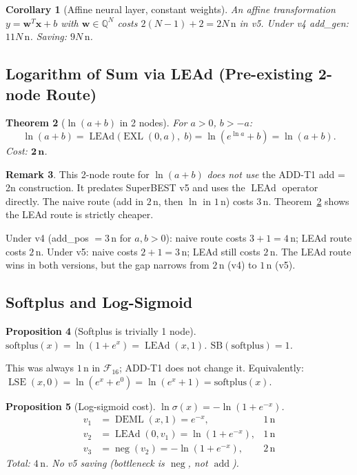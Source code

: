 \documentclass[12pt,a4paper]{article}
\newtheorem{theorem}{Theorem}[section]
\newtheorem{corollary}[theorem]{Corollary}
\newtheorem{proposition}[theorem]{Proposition}
\theoremstyle{definition}
\newtheorem{remark}[theorem]{Remark}
\newcommand{\EXL}{\operatorname{EXL}}
\newcommand{\DEML}{\operatorname{DEML}}
\newcommand{\LEAd}{\operatorname{LEAd}}
\newcommand{\addop}{\operatorname{add}}
\newcommand{\negop}{\operatorname{neg}}
\newcommand{\SB}{\mathrm{SB}}
\newcommand{\LSE}{\operatorname{LSE}}
\newcommand{\F}{\mathcal{F}_{16}}
\begin{document}
\begin{corollary}[Affine neural layer, constant weights]
An affine transformation $y = \mathbf{w}^T \mathbf{x} + b$ with
$\mathbf{w} \in \mathbb{Q}^N$ costs $2(N-1) + 2 = 2N\,\text{n}$ in v5.
Under v4 add\_gen: $11N\,\text{n}$.  Saving: $9N\,\text{n}$.
\end{corollary}

\subsection{Logarithm of Sum via LEAd (Pre-existing 2-node Route)}

\begin{theorem}[$\ln(a+b)$ in 2 nodes]
\label{thm:ln_sum}
For $a > 0$, $b > -a$:
\[
  \ln(a + b) = \LEAd\!\bigl(\EXL(0,a),\;b\bigr) = \ln(e^{\ln a} + b) = \ln(a + b).
\]
Cost: $\mathbf{2\,\text{n}}$.
\end{theorem}

\begin{remark}
This 2-node route for $\ln(a+b)$ \emph{does not use} the ADD-T1 add = 2n
construction.  It predates SuperBEST v5 and uses the $\LEAd$ operator directly.
The naive route (add in $2\,\text{n}$, then $\ln$ in $1\,\text{n}$) costs $3\,\text{n}$.
Theorem~\ref{thm:ln_sum} shows the LEAd route is strictly cheaper.

Under v4 (add\_pos $= 3\,\text{n}$ for $a, b > 0$): naive route costs $3 + 1 = 4\,\text{n}$;
LEAd route costs $2\,\text{n}$.  Under v5: naive costs $2 + 1 = 3\,\text{n}$;
LEAd still costs $2\,\text{n}$.  The LEAd route wins in both versions,
but the gap narrows from $2\,\text{n}$ (v4) to $1\,\text{n}$ (v5).
\end{remark}

\subsection{Softplus and Log-Sigmoid}

\begin{proposition}[Softplus is trivially 1 node]
$\mathrm{softplus}(x) = \ln(1 + e^x) = \LEAd(x, 1)$.
$\SB(\mathrm{softplus}) = 1$.
\end{proposition}

This was always $1\,\text{n}$ in $\F$; ADD-T1 does not change it.
Equivalently: $\LSE(x, 0) = \ln(e^x + e^0) = \ln(e^x + 1) = \mathrm{softplus}(x)$.

\begin{proposition}[Log-sigmoid cost]
$\ln \sigma(x) = -\ln(1 + e^{-x})$.
\begin{align*}
  v_1 &= \DEML(x,1) = e^{-x},  & 1\,\text{n} \\
  v_2 &= \LEAd(0, v_1) = \ln(1 + e^{-x}),  & 1\,\text{n} \\
  v_3 &= \negop(v_2) = -\ln(1 + e^{-x}),  & 2\,\text{n}
\end{align*}
Total: $4\,\text{n}$.  No v5 saving (bottleneck is $\negop$, not $\addop$).
\end{proposition}
\end{document}
